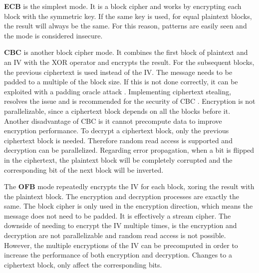 \textbf{\ac{ECB}} is the simplest mode. It is a block cipher and works by encrypting each block with the symmetric key. If the same key is used, for equal plaintext blocks, the result will always be the same. For this reason, patterns are easily seen and the mode is considered insecure.

\textbf{\ac{CBC}} is another block cipher mode. It combines the first block of plaintext and an IV with the XOR operator and encrypts the result. For the subsequent blocks, the previous ciphertext is used instead of the IV. The message needs to be padded to a multiple of the block size. If this is not done correctly, it can be exploited with a padding oracle attack \cite{paddingoracle}. Implementing ciphertext stealing, resolves the issue and is recommended for the security of \ac{CBC} \cite{ciphertextstealing}.
Encryption is not parallelizable, since a ciphertext block depends on all the blocks before it. Another disadvantage of \ac{CBC} is it cannot precompute data to improve encryption performance.
To decrypt a ciphertext block, only the previous ciphertext block is needed. Therefore random read access is supported and decryption can be parallelized.
Regarding error propagation, when a bit is flipped in the ciphertext, the plaintext block will be completely corrupted and the corresponding bit of the next block will be inverted.

The \textbf{\ac{OFB}} mode repeatedly encrypts the IV for each block, xoring the result with the plaintext block.
The encryption and decryption processes are exactly the same.
The block cipher is only used in the encryption direction, which means the message does not need to be padded. It is effectively a stream cipher.
The downside of needing to encrypt the IV multiple times, is the encryption and decryption are not parallelizable and random read access is not possible. However, the multiple encryptions of the IV can be precomputed in order to increase the performance of both encryption and decryption.
Changes to a ciphertext block, only affect the corresponding bits.

